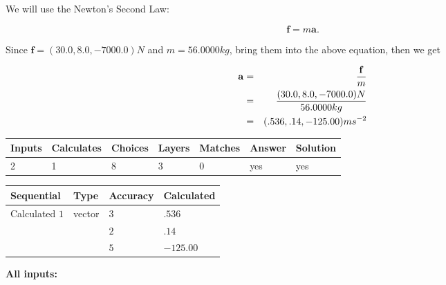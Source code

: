 \documentclass[12pt]{article}
\begin{document}
 

We will use the Newton's Second Law:
 
\[
\mathbf{f}=m\mathbf{a}.
\]
 
Since $\mathbf{f}= %
(30.0 , 8.0 , -7000.0) N$
and $m= %
56.0000kg$, bring them into the above equation, then we get
 
\begin{eqnarray*}
\mathbf{a}&=&\frac{\mathbf{f}}m  \\
&=&\frac{ %
(30.0 , 8.0 , -7000.0) N}{ %
56.0000kg}  \\
&=& %
(.536 , .14 , -125.00) ms^{-2}
\end{eqnarray*}
 
 
 
\noindent{}
 
 

 
\vspace{0.3in}
   
   
   
   
\noindent\begin{tabular}{|l|l|l|l|l|l|l|}
 \hline
Inputs & Calculates & Choices & Layers & Matches & Answer & Solution \\ \hline
           2 & 
           1 & 
           8
  & 
           3 & 
           0 & 
  yes & 
  yes 
  \\ \hline
 \end{tabular}
   
   
   
   
\noindent{}
   
   
  
  
\noindent\begin{tabular}{|l|l|l|l|}
\hline
 Sequential & Type & Accuracy & Calculated \\ 
\hline
 
 
  Calculated $           1$ & vector &  
  $           3 $ 
 &  $ .536 $ 
 \\    
  & & 
  $           2 $ 
 &  $ .14 $ 
 \\    
  & & 
  $           5 $ 
 &  $ -125.00 $ 
 \\  \hline  
 \end{tabular}
   
   
   
   
\noindent\vspace{0.1in}\hspace{-0.08in} {\textbf{\Large{All inputs: }}}
   
\end{document}
